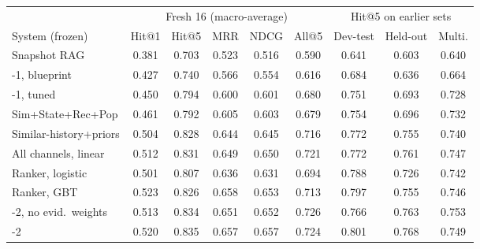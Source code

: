 \begin{tabular}{l@{\hspace{4pt}}ccccc|ccc}
\toprule
 & \multicolumn{5}{c|}{Fresh 16 (macro-average)} & \multicolumn{3}{c}{Hit@5 on earlier sets} \\
System (frozen) & Hit@1 & Hit@5 & MRR & NDCG & All@5 & Dev-test & Held-out & Multi. \\
\midrule
Snapshot RAG & 0.381 & 0.703 & 0.523 & 0.516 & 0.590 & 0.641 & 0.603 & 0.640 \\
\midrule
\sys{}-1, blueprint & 0.427 & 0.740 & 0.566 & 0.554 & 0.616 & 0.684 & 0.636 & 0.664 \\
\sys{}-1, tuned & 0.450 & 0.794 & 0.600 & 0.601 & 0.680 & 0.751 & 0.693 & 0.728 \\
\midrule
Sim+State+Rec+Pop & 0.461 & 0.792 & 0.605 & 0.603 & 0.679 & 0.754 & 0.696 & 0.732 \\
Similar-history+priors & 0.504 & 0.828 & 0.644 & 0.645 & 0.716 & 0.772 & 0.755 & 0.740 \\
All channels, linear & 0.512 & 0.831 & 0.649 & 0.650 & 0.721 & 0.772 & 0.761 & 0.747 \\
Ranker, logistic & 0.501 & 0.807 & 0.636 & 0.631 & 0.694 & 0.788 & 0.726 & 0.742 \\
Ranker, GBT & 0.523 & 0.826 & 0.658 & 0.653 & 0.713 & 0.797 & 0.755 & 0.746 \\
\midrule
\sys{}-2, no evid.\ weights & 0.513 & 0.834 & 0.651 & 0.652 & 0.726 & 0.766 & 0.763 & 0.753 \\
\sys{}-2 & 0.520 & 0.835 & 0.657 & 0.657 & 0.724 & 0.801 & 0.768 & 0.749 \\
\bottomrule
\end{tabular}